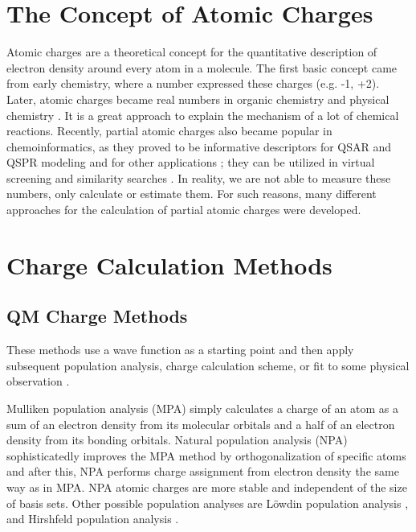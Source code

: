 \section{The Concept of Atomic Charges}

Atomic charges are a theoretical concept for the quantitative description of
electron density around every atom in a molecule. The first basic concept came
from early chemistry, where a number expressed these charges (e.g. -1, +2).
Later, atomic charges became real numbers in organic chemistry and
physical chemistry \cite{Atkins2011}. It is a great approach to explain the
mechanism of a lot of chemical reactions. Recently, partial atomic charges also
became popular in chemoinformatics, as they proved to be informative descriptors
for QSAR and QSPR modeling \cite{Chaves2006, Gross2002} and for other
applications \cite{Moller2005, Zhang2006, Ghafourian2000}; they can be utilized
in virtual screening \cite{Galvez1994, Stalke2011} and similarity
searches \cite{Lyne2002, Bissantz2000}. In reality, we are not able to measure
these numbers, only calculate or estimate them. For such reasons, many different
approaches for the calculation of partial atomic charges were developed.

\section{Charge Calculation Methods}

\subsection{QM Charge Methods}

These methods use a wave function as a starting point and then apply subsequent
population analysis, charge calculation scheme, or fit to some physical
observation \cite{Cramer2005}. 

Mulliken population analysis (MPA) \cite{Mulliken1955, Mulliken1955a} simply
calculates a charge of an atom as a sum of an electron density from its
molecular orbitals and a half of an electron density from its bonding orbitals.
Natural population analysis (NPA) \cite{Reed1983, Reed1985} sophisticatedly
improves the MPA method by orthogonalization of specific atoms and after this,
NPA performs charge assignment from electron density the same way as in MPA.
NPA atomic charges are more stable and independent of the size of basis sets.
Other possible population analyses are Löwdin population
analysis \cite{Lowdin1950}, and Hirshfeld population analysis \cite{Hirshfeld1977}.

